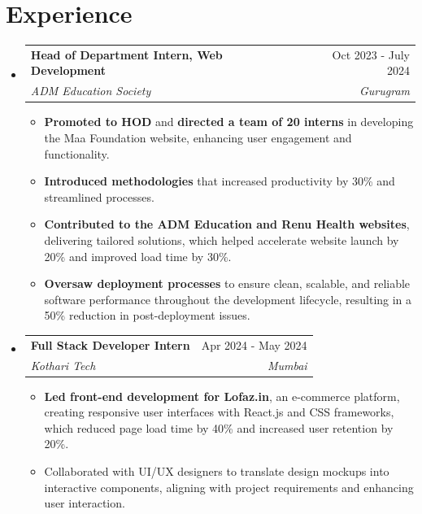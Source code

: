 \documentclass[a4paper,11pt]{article}
\makeatletter
\newcommand{\resumeItem}[1]{
  \item\small{
    {#1 \vspace{-2pt}}
  }
}
\newcommand{\resumeSubheading}[4]{
  \vspace{-2pt}\item
    \begin{tabular*}{0.97\textwidth}[t]{l@{\extracolsep{\fill}}r}
      \textbf{#1} & #2 \\
      \textit{\small#3} & \textit{\small #4} \\
    \end{tabular*}\vspace{-7pt}
}
\newcommand{\resumeItemListStart}{\begin{itemize}}
\newcommand{\resumeItemListEnd}{\end{itemize}\vspace{-5pt}}
\makeatother
\begin{document}
\section*{Experience}
    \begin{itemize}[leftmargin=0.15in, label={}]
        \resumeSubheading
          {Head of Department Intern, Web Development}{Oct 2023 - July 2024}{ADM Education Society}{Gurugram}
          \resumeItemListStart
            \resumeItem{\textbf{Promoted to HOD} and \textbf{directed a team of 20 interns} in developing the Maa Foundation website, enhancing user engagement and functionality.}
            \resumeItem{\textbf{Introduced methodologies} that increased productivity by 30\% and streamlined processes.}
            \resumeItem{\textbf{Contributed to the ADM Education and Renu Health websites}, delivering tailored solutions, which helped accelerate website launch by 20\% and improved load time by 30\%.}
            \resumeItem{\textbf{Oversaw deployment processes} to ensure clean, scalable, and reliable software performance throughout the development lifecycle, resulting in a 50\% reduction in post-deployment issues.}
          \resumeItemListEnd
        
        \resumeSubheading
          {Full Stack Developer Intern}{Apr 2024 - May 2024}{Kothari Tech}{Mumbai}
          \resumeItemListStart
            \resumeItem{\textbf{Led front-end development for Lofaz.in}, an e-commerce platform, creating responsive user interfaces with React.js and CSS frameworks, which reduced page load time by 40\% and increased user retention by 20\%.}
            \resumeItem{Collaborated with UI/UX designers to translate design mockups into interactive components, aligning with project requirements and enhancing user interaction.}
          \resumeItemListEnd
    \end{itemize}

\vspace{-7pt}
\end{document}
